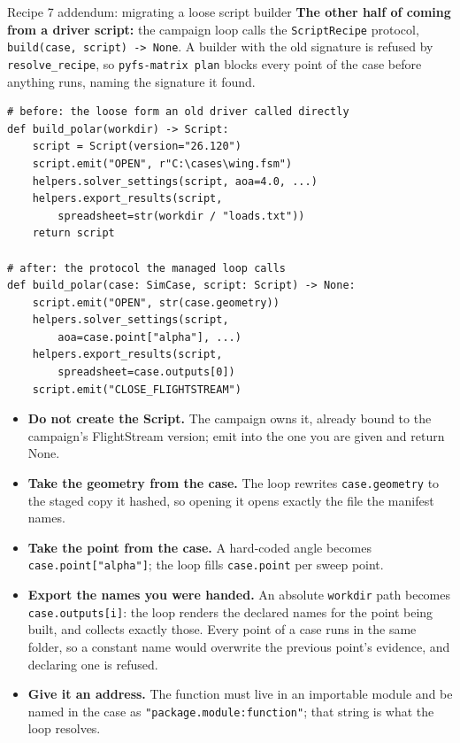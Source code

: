 \documentclass[aspectratio=169,10pt]{beamer}
\newcommand{\code}[1]{\texttt{\small #1}}
\begin{document}
\begin{frame}{Recipe 7 addendum: migrating a loose script builder}
  \textbf{The other half of coming from a driver script:} the campaign loop calls the \code{ScriptRecipe} protocol, \code{build(case, script) -> None}. A builder with the old signature is refused by \code{resolve\_recipe}, so \code{pyfs-matrix plan} blocks every point of the case before anything runs, naming the signature it found.
\begin{lstlisting}
# before: the loose form an old driver called directly
def build_polar(workdir) -> Script:
    script = Script(version="26.120")
    script.emit("OPEN", r"C:\cases\wing.fsm")
    helpers.solver_settings(script, aoa=4.0, ...)
    helpers.export_results(script,
        spreadsheet=str(workdir / "loads.txt"))
    return script

# after: the protocol the managed loop calls
def build_polar(case: SimCase, script: Script) -> None:
    script.emit("OPEN", str(case.geometry))
    helpers.solver_settings(script,
        aoa=case.point["alpha"], ...)
    helpers.export_results(script,
        spreadsheet=case.outputs[0])
    script.emit("CLOSE_FLIGHTSTREAM")
\end{lstlisting}
  \begin{itemize}
    \item \textbf{Do not create the Script.} The campaign owns it, already bound to the campaign's FlightStream version; emit into the one you are given and return None.
    \item \textbf{Take the geometry from the case.} The loop rewrites \code{case.geometry} to the staged copy it hashed, so opening it opens exactly the file the manifest names.
    \item \textbf{Take the point from the case.} A hard-coded angle becomes \code{case.point["alpha"]}; the loop fills \code{case.point} per sweep point.
    \item \textbf{Export the names you were handed.} An absolute \code{workdir} path becomes \code{case.outputs[i]}: the loop renders the declared names for the point being built, and collects exactly those. Every point of a case runs in the same folder, so a constant name would overwrite the previous point's evidence, and declaring one is refused.
    \item \textbf{Give it an address.} The function must live in an importable module and be named in the case as \code{"package.module:function"}; that string is what the loop resolves.
  \end{itemize}
\end{frame}
\end{document}
